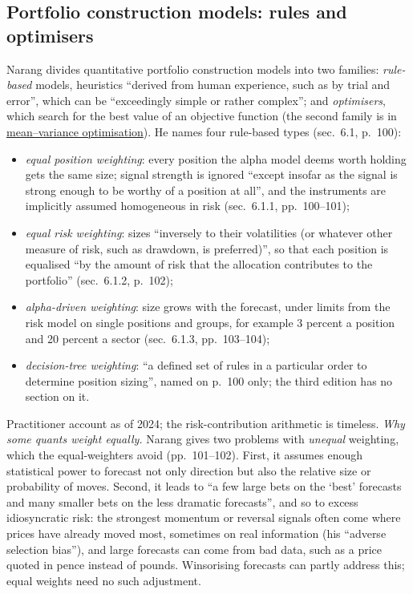 \subsection{Portfolio construction models: rules and optimisers}

\begin{qfmethod}\label{meth:rule-based-position-sizing}
 Narang divides quantitative portfolio construction models into two families: \emph{rule-based} models, heuristics ``derived from human experience, such as by trial and error'', which can be ``exceedingly simple or rather complex''; and \emph{optimisers}, which search for the best value of an objective function \citep[chap.~6, ``Portfolio Construction Models'', pp.~99--100]{s7-narang} (the second family is in \hyperref[mod:mean-variance-portfolio-optimisation]{mean--variance optimisation}). He names four rule-based types (sec.~6.1, p.~100):
\begin{itemize}
\item \emph{equal position weighting}: every position the alpha model deems worth holding gets the same size; signal strength is ignored ``except insofar as the signal is strong enough to be worthy of a position at all'', and the instruments are implicitly assumed homogeneous in risk (sec.~6.1.1, pp.~100--101);
\item \emph{equal risk weighting}: sizes ``inversely to their volatilities (or whatever other measure of risk, such as drawdown, is preferred)'', so that each position is equalised ``by the amount of risk that the allocation contributes to the portfolio'' (sec.~6.1.2, p.~102);
\item \emph{alpha-driven weighting}: size grows with the forecast, under limits from the risk model on single positions and groups, for example 3 percent a position and 20 percent a sector (sec.~6.1.3, pp.~103--104);
\item \emph{decision-tree weighting}: ``a defined set of rules in a particular order to determine position sizing'', named on p.~100 only; the third edition has no section on it.
\end{itemize}

 Practitioner account as of 2024; the risk-contribution arithmetic is timeless. \emph{Why some quants weight equally.} Narang gives two problems with \emph{unequal} weighting, which the equal-weighters avoid (pp.~101--102). First, it assumes enough statistical power to forecast not only direction but also the relative size or probability of moves. Second, it leads to ``a few large bets on the `best' forecasts and many smaller bets on the less dramatic forecasts'', and so to excess idiosyncratic risk: the strongest momentum or reversal signals often come where prices have already moved most, sometimes on real information (his ``adverse selection bias''), and large forecasts can come from bad data, such as a price quoted in pence instead of pounds. Winsorising forecasts can partly address this; equal weights need no such adjustment.


\end{qfmethod}
